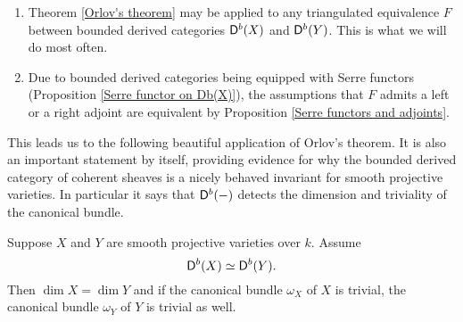 \begin{remark}
    \begin{enumerate}[label = (\roman*)]
        \item Theorem \ref{Orlov's theorem} may be applied to any triangulated equivalence $F$ between bounded derived categories $\mathsf{D}^b(X)$ and $\mathsf{D}^b(Y)$. This is what we will do most often. 
        \item Due to bounded derived categories being equipped with Serre functors (Proposition \ref{Serre functor on Db(X)}), the assumptions that $F$ admits a left or a right adjoint are equivalent by Proposition \ref{Serre functors and adjoints}.
    \end{enumerate}
\end{remark}

This leads us to the following beautiful application of Orlov's theorem. It is also an important statement by itself, providing evidence for why the bounded derived category of coherent sheaves is a nicely behaved invariant for smooth projective varieties. In particular it says that $\mathsf{D}^b(-)$ detects the dimension and triviality of the canonical bundle.  
\begin{theorem}
    \label{Db detects dimension and triviality of canonical bundle}
    Suppose $X$ and $Y$ are smooth projective varieties over $k$. Assume
    \[
        \mathsf{D}^b(X) \simeq \mathsf{D}^b(Y).
    \]
    Then $\dim X = \dim Y$ and if the canonical bundle $\omega_X$ of $X$ is trivial, the canonical bundle $\omega_Y$ of $Y$ is trivial as well.
\end{theorem}


